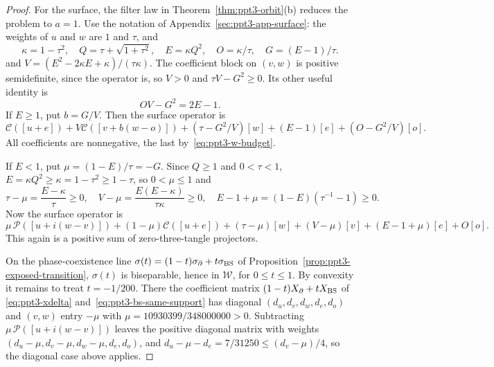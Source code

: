 \begin{proof}
For the surface, the filter law in Theorem~\ref{thm:ppt3-orbit}(b) reduces the problem to $a=1$.
Use the notation of Appendix~\ref{sec:ppt3-app-surface}: the weights of $u$ and $w$ are $1$ and $\tau$, and
\[
 \kappa=1-\tau^2,\quad Q=\tau+\sqrt{1+\tau^2},\quad
 E=\kappa Q^2,\quad O=\kappa/\tau,\quad G=(E-1)/\tau.
\]
and $V=(E^2-2\kappa E+\kappa)/(\tau\kappa)$. The coefficient block on $(v,w)$ is positive semidefinite, since the operator
is, so $V>0$ and $\tau V-G^2\ge0$.
Its other useful identity is
\begin{equation}\label{eq:ppt3-w-budget}
 OV-G^2=2E-1.
\end{equation}
If $E\ge1$, put $b=G/V$. Then the surface operator is
\[
 \mathcal C([u+e])+V\mathcal C([v+b(w-o)])
 +(\tau-G^2/V)[w]+(E-1)[e]+(O-G^2/V)[o].
\]
All coefficients are nonnegative, the last by~\eqref{eq:ppt3-w-budget}.

If $E<1$, put $\mu=(1-E)/\tau=-G$. Since $Q\ge1$ and $0<\tau<1$, $E=\kappa Q^2\ge\kappa=1-\tau^2\ge1-\tau$, so $0<\mu\le1$ and
\[
 \tau-\mu=\frac{E-\kappa}{\tau}\ge0,\quad
 V-\mu=\frac{E(E-\kappa)}{\tau\kappa}\ge0,\quad
 E-1+\mu=(1-E)(\tau^{-1}-1)\ge0.
\]
Now the surface operator is
\[
 \mu\,\mathcal P([u+i(w-v)])+(1-\mu)\mathcal C([u+e])
 +(\tau-\mu)[w]+(V-\mu)[v]+(E-1+\mu)[e]+O[o].
\]
This again is a positive sum of zero-three-tangle projectors.

On the phase-coexistence line $\sigma(t)=(1-t)\sigma_\partial+t\sigma_{\rm BS}$ of
Proposition~\ref{prop:ppt3-exposed-transition}, $\sigma(t)$ is biseparable, hence in $\mathcal W$, for $0\le t\le1$. By
convexity it remains to treat $t=-1/200$. There the coefficient matrix $(1-t)X_\partial+tX_{\rm BS}$ of
\eqref{eq:ppt3-xdelta} and~\eqref{eq:ppt3-bs-same-support} has diagonal $(d_u,d_v,d_w,d_e,d_o)$ and $(v,w)$ entry $-\mu$ with
$\mu=10930399/348000000>0$. Subtracting $\mu\,\mathcal P([u+i(w-v)])$ leaves the positive diagonal matrix with weights
$(d_u-\mu,d_v-\mu,d_w-\mu,d_e,d_o)$, and $d_u-\mu-d_e=7/31250\le(d_v-\mu)/4$, so the diagonal case above applies.


\end{proof}
